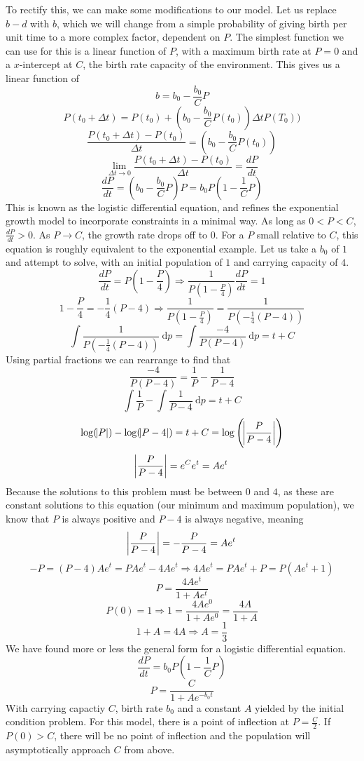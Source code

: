 \documentclass[12pt]{report}
\begin{document}
\begin{flushleft}
\bigskip
To rectify this, we can make some modifications to our model. Let us replace 
\(b - d\) with \(b\), which we will change from a simple probability of giving
birth per unit time to a more complex factor, dependent on \(P\). The simplest
function we can use for this is a linear function of \(P\), with a maximum
birth rate at \(P = 0\) and a \(x\)-intercept at \(C\), the birth rate capacity
of the environment. This gives us a linear function of
\[b = b_0 - \frac{b_0}{C}P\]
\[P(t_0 + \Delta t) = P(t_0) + (b_0 - \frac{b_0}{C}P(t_0))\Delta tP(T_0))\]
\[\frac{P(t_0 + \Delta t) - P(t_0)}{\Delta t} = (b_0 - \frac{b_0}{C}P(t_0))\]
\[\lim_{\Delta t \rightarrow 0} \frac{P(t_0 + \Delta t) - P(t_0)}{\Delta t} 
= \frac{dP}{dt}\]
\[\frac{dP}{dt} = (b_0 - \frac{b_0}{C}P)P = b_0P(1 - \frac{1}{C}P)\]
This is known as the logistic differential equation, and refines the
exponential growth model to incorporate constraints in a minimal way. As long
as \(0 < P < C\), \(\frac{dP}{dt} > 0\). As \(P \rightarrow C\), the growth
rate drops off to \(0\). For a \(P\) small relative to \(C\), this equation is
roughly equivalent to the exponential example. Let us take a \(b_0\) of \(1\)
and attempt to solve, with an initial population of \(1\) and carrying capacity
of \(4\).
\[\frac{dP}{dt} = P(1 - \frac{P}{4}) \Rightarrow \frac{1}{P(1 - \frac{P}{4})}
\frac{dP}{dt} = 1\]
\[1 - \frac{P}{4} = -\frac{1}{4}(P - 4) 
\Rightarrow \frac{1}{P(1 - \frac{P}{4})} = \frac{1}{P(-\frac{1}{4}(P - 4) )}\]
\[\int \frac{1}{P(-\frac{1}{4}(P - 4) )} \:\mathrm{d}p 
= \int \frac{-4}{P(P - 4)} \:\mathrm{d}p = t + C\]
Using partial fractions we can rearrange to find that
\[\frac{-4}{P(P - 4)} = \frac{1}{P} - \frac{1}{P - 4}\]
\[\int \frac{1}{P} - \int \frac{1}{P - 4} \:\mathrm{d}p = t + C\]
\[\log(\abs{P}) - \log(\abs{P - 4}) = t + C 
= \log\left(\abs{\frac{P}{P - 4}}\right)\]
\[\abs{\frac{P}{P - 4}} = e^Ce^t = Ae^t\]
Because the solutions to this problem must be between \(0\) and \(4\), as these
are constant solutions to this equation (our minimum and maximum population),
we know that \(P\) is always positive and \(P - 4\) is always negative, meaning
\[\abs{\frac{P}{P - 4}} = -\frac{P}{P - 4} = Ae^t\]
\[-P = (P - 4)Ae^t = PAe^t - 4Ae^t \Rightarrow 4Ae^t =PAe^t + P = P(Ae^t + 1)\]
\[P = \frac{4Ae^t}{1 + Ae^t}\]
\[P(0) = 1 \Rightarrow 1 = \frac{4Ae^0}{1 + Ae^0} = \frac{4A}{1 + A}\]
\[1 + A = 4A \Rightarrow A = \frac{1}{3}\]
We have found more or less the general form for a logistic differential
equation.
\[\frac{dP}{dt} = b_0P(1 - \frac{1}{C}P)\]
\[P = \frac{C}{1 + Ae^{-b_0t}}\]
With carrying capactiy \(C\), birth rate \(b_0\) and a constant \(A\) yielded
by the initial condition problem. For this model, there is a point of
inflection at \(P = \frac{C}{2}\). If \(P(0) > C\), there will be no point of
inflection and the population will asymptotically approach \(C\) from above.

\end{flushleft}
\end{document}
